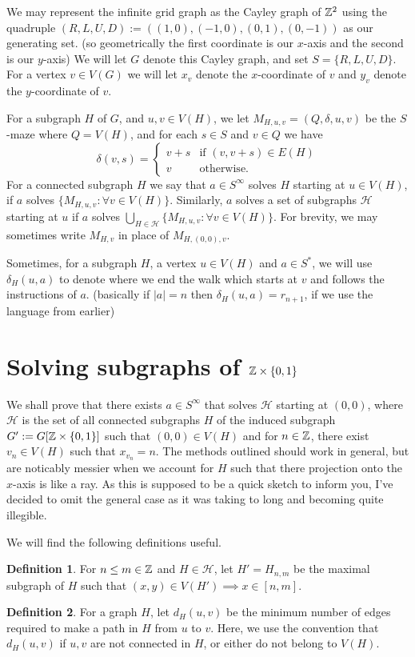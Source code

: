 \documentclass[a4paper]{article}
\theoremstyle{definition}
\newtheorem*{defn}{Definition}
\begin{document}
We may represent the infinite grid graph as the Cayley graph of $\Bbb{Z}^2$ using the quadruple $(R,L,U,D):=((1,0),(-1,0),(0,1),(0,-1))$ as our generating set. (so geometrically the first coordinate is our $x$-axis and the second is our $y$-axis) We will let $G$ denote this Cayley graph, and set $S=\{R,L,U,D\}$. For a vertex $v \in V(G)$ we will let $x_v$ denote the $x$-coordinate of $v$ and $y_v$ denote the $y$-coordinate of $v$.

For a subgraph $H$ of $G$, and $u,v \in V(H)$, we let $M_{H,u,v} = (Q,\delta,u,v)$ be the $S$-maze where $Q = V(H)$, and for each $s \in S$ and $v \in Q$ we have \[\delta(v,s) = \begin{cases}v+s &\textrm{if $(v,v+s) \in E(H)$}\\v &\textrm{otherwise.}\end{cases}\]
For a connected subgraph $H$ we say that $a \in S^\infty$ solves $H$ starting at $u \in V(H)$, if $a$ solves $\{M_{H,u,v}:\forall v \in V(H)\}$. Similarly, $a$ solves a set of subgraphs $\mathcal{H}$ starting at $u$ if $a$ solves $\bigcup_{H \in \mathcal{H}}\{M_{H,u,v}:\forall v \in V(H)\}$. For brevity, we may sometimes write $M_{H,v}$ in place of $M_{H,(0,0),v}$.

Sometimes, for a subgraph $H$, a vertex $u \in V(H)$ and $a \in S^*$, we will use $\delta_H(u,a)$ to denote where we end the walk which starts at $v$ and follows the instructions of $a$. (basically if $|a| =n$ then $\delta_H(u,a) = r_{n+1}$, if we use the language from earlier)

\section{\texorpdfstring{Solving subgraphs of $\Bbb{Z}\times \{0,1\}$}{Solving subgraphs of Z x {0,1}}}

We shall prove that there exists $a \in S^\infty$ that solves $\mathcal{H}$ starting at $(0,0)$, where $\mathcal{H}$ is the set of all connected subgraphs $H$ of the induced subgraph $G' := G[ \Bbb{Z}\times \{0,1\}]$ such that $(0,0) \in V(H)$ and for $n \in \Bbb{Z}$, there exist $v_n \in V(H)$ such that $x_{v_n} = n$. The methods outlined should work in general, but are noticably messier when we account for $H$ such that there projection onto the $x$-axis is like a ray. As this is supposed to be a quick sketch to inform you, I've decided to omit the general case as it was taking to long and becoming quite illegible.

We will find the following definitions useful.
\begin{defn} For $n\le m\in \Bbb{Z}$ and $H \in\mathcal{H}$, let $H' = H_{n,m}$ be the maximal subgraph of $H$ such that $(x,y) \in V(H')\implies x \in [n,m]$.
\end{defn}
\begin{defn} For a graph $H$, let $d_H(u,v)$ be the minimum number of edges required to make a path in $H$ from $u$ to $v$. Here, we use the convention that $d_H(u,v)$ if $u,v$ are not connected in $H$, or either do not belong to $V(H)$.
\end{defn}
\end{document}
